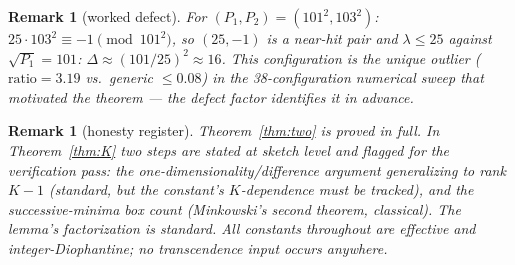 \documentclass[11pt]{article}
\newtheorem{remark}[theorem]{Remark}
\begin{document}
\begin{remark}[worked defect]
For $(P_1,P_2)=(101^2,103^2)$: $25\cdot103^2\equiv-1\pmod{101^2}$, so
$(25,-1)$ is a near-hit pair and $\lambda\le25$ against
$\sqrt{P_1}=101$: $\Delta\approx(101/25)^2\approx16$.  This configuration is
the unique outlier ($\mathrm{ratio}=3.19$ vs.\ generic $\le0.08$) in the
38-configuration numerical sweep that motivated the theorem --- the defect
factor identifies it in advance.
\end{remark}

\begin{remark}[honesty register]
Theorem~\ref{thm:two} is proved in full.  In Theorem~\ref{thm:K} two steps are
stated at sketch level and flagged for the verification pass: the
one-dimensionality/difference argument generalizing to rank $K-1$ (standard,
but the constant's $K$-dependence must be tracked), and the successive-minima
box count (Minkowski's second theorem, classical).  The lemma's factorization
is standard.  All constants throughout are effective and integer-Diophantine;
no transcendence input occurs anywhere.
\end{remark}
\end{document}
